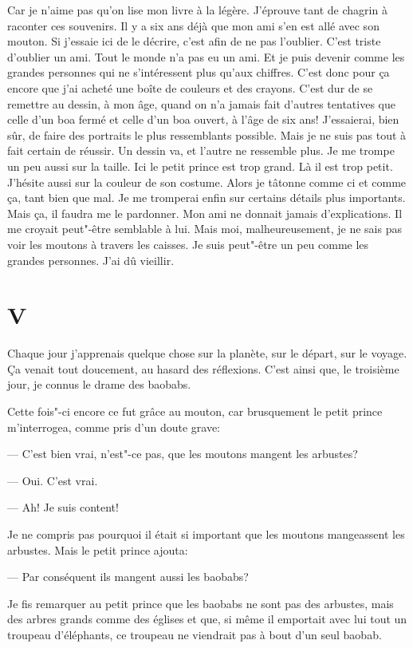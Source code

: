 \begin{Parallel}[p]{}{}
{Car je n'aime pas qu'on lise mon livre à la légère.
J'éprouve tant de chagrin à raconter ces souvenirs. Il y a
six ans déjà que mon ami s'en est allé avec son
mouton. Si j'essaie ici de le décrire, c'est afin de ne
pas l'oublier. C'est triste d'oublier un ami. Tout le
monde n'a pas eu un ami. Et je puis devenir comme les grandes personnes qui ne s'intéressent plus
qu'aux chiffres. C'est donc pour ça encore que j'ai
acheté une boîte de couleurs et des crayons. C'est
dur de se remettre au dessin, à mon âge, quand on
n'a jamais fait d'autres tentatives que celle d'un boa
fermé et celle d'un boa ouvert, à l'âge de six ans!
J'essaierai, bien sûr, de faire des portraits le plus ressemblants possible. Mais je ne suis pas tout à fait certain de réussir. Un dessin va, et l'autre ne ressemble
plus. Je me trompe un peu aussi sur la taille. Ici le
petit prince est trop grand. Là il est trop petit. J'hésite aussi sur la couleur de son costume. Alors je
tâtonne comme ci et comme ça, tant bien que mal.
Je me tromperai enfin sur certains détails plus
importants. Mais ça, il faudra me le pardonner. Mon
ami ne donnait jamais d'explications. Il me croyait
peut"-être semblable à lui. Mais moi, malheureusement, je ne sais pas voir les moutons à travers les
caisses. Je suis peut"-être un peu comme les grandes
personnes. J'ai dû vieillir.

\section{V}

Chaque jour j'apprenais quelque chose sur la
planète, sur le départ, sur le voyage. Ça venait tout
doucement, au hasard des réflexions. C'est ainsi
que, le troisième jour, je connus le drame des baobabs.

Cette fois"-ci encore ce fut grâce au mouton, car
brusquement le petit prince m'interrogea, comme
pris d'un doute grave:

--- C'est bien vrai, n'est"-ce pas, que les moutons
mangent les arbustes?

--- Oui. C'est vrai.

--- Ah! Je suis content!

Je ne compris pas pourquoi il était si important
que les moutons mangeassent les arbustes. Mais le
petit prince ajouta:

--- Par conséquent ils mangent aussi les baobabs?

Je fis remarquer au petit prince que les baobabs
ne sont pas des arbustes, mais des arbres grands
comme des églises et que, si même il emportait avec
lui tout un troupeau d'éléphants, ce troupeau ne
viendrait pas à bout d'un seul baobab.

}
\end{Parallel}
